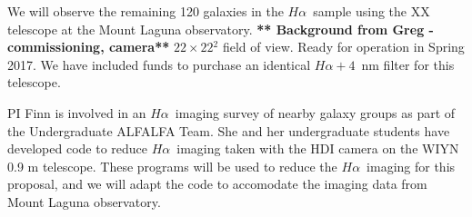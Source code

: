 \documentclass[11pt, preprint]{aastex}
\newcommand{\ha}{$H\alpha$}
\begin{document}
We will observe the remaining 120 galaxies in the \ha \ sample using the
XX telescope at the Mount Laguna observatory.  
{\bf *** Background from Greg - commissioning, camera**}  $22\times
22$\arcmin$^2$ field of view.  Ready for operation in Spring 2017.
We have included funds to purchase an identical 
$H\alpha+4$~nm filter for this telescope.  


PI Finn is involved in an \ha \ imaging survey of nearby galaxy groups
as part of the Undergraduate ALFALFA Team.  She and her undergraduate
students have developed code to reduce \ha \ imaging taken with the HDI camera on
the WIYN 0.9 m telescope.  These programs will be used to reduce the
\ha \ imaging for this proposal, and we will adapt the code to
accomodate the imaging data from Mount Laguna observatory.

\end{document}
